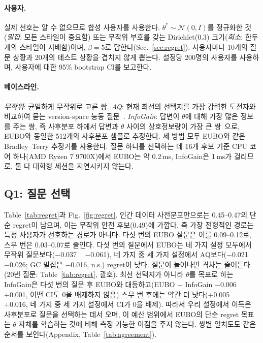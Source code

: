 \paragraph{사용자.} 실제 선호는 알 수 없으므로 합성 사용자를 사용한다. $\theta^\ast \sim \mathcal{N}(0,I)$를 정규화한 것
(\emph{밀집}: 모든 스타일이 중요함) 또는 무작위 부호를 갖는 Dirichlet(0.3) 크기(\emph{희소}: 한두 개의 스타일이 지배함)이며,
$\beta=5$로 답한다(Sec.~\ref{sec:regret}). 사용자마다 10개의 질문 상황과 20개의 테스트 상황을 겹치지 않게 뽑는다.
설정당 200명의 사용자를 사용하며, 사용자에 대한 95\% bootstrap CI를 보고한다.

\paragraph{베이스라인.} \emph{무작위}: 균일하게 무작위로 고른 쌍. \emph{AQ}: 현재 최선의 선택지를 가장 강력한 도전자와
비교하여 묻는 version-space 능동 질문~\citep{padurean2025useralign}. \emph{InfoGain}: 답변이 $\theta$에 대해 가장 많은 정보를 주는 쌍,
즉 사후분포 하에서 답변과 $\theta$ 사이의 상호정보량이 가장 큰 쌍~\citep{sadigh2017active}으로, EUBO와 동일한 512개의 사후분포 샘플로
추정한다. 세 방법 모두 EUBO와 같은 Bradley--Terry 추정기를 사용한다. 질문 하나를 선택하는 데 16개 후보 기준 CPU 코어 하나(AMD Ryzen 7 9700X)에서
EUBO는 약 0.2\,ms, InfoGain은 1\,ms가 걸리므로, 둘 다 대화형 세션을 지연시키지 않는다.

\subsection{Q1: 질문 선택}
Table~\ref{tab:regret}과 Fig.~\ref{fig:regret}. 인간 데이터 사전분포만으로는 0.45--0.47의 단순 regret이 남으며, 이는 무작위
안전 후보(0.49)에 가깝다. 즉 가장 전형적인 경로는 특정 사용자가 선호하는 경로가 아니다. 다섯 번의 EUBO 질문은 이를 0.09--0.12로, 스무 번은
0.03--0.07로 줄인다. 다섯 번의 질문에서 EUBO는 네 가지 설정 모두에서 무작위 질문보다($-$0.037 ~ $-$0.061), 네 가지 중 세 가지 설정에서
AQ보다($-$0.021 ~ $-$0.026; GC 밀집은 $-$0.016, n.s.) regret이 낮다. 질문이 늘어나면 격차는 줄어든다(20번 질문: Table~\ref{tab:regret}, 괄호).
최선 선택지가 아니라 $\theta$를 목표로 하는 InfoGain은 다섯 번의 질문 후 EUBO와 대등하고(EUBO $-$ InfoGain $-$0.006 ~
+0.001, 어떤 CI도 0을 배제하지 않음) 스무 번 후에는 약간 더 낫다(+0.005 ~ +0.016, 네 가지 중 세 가지 설정에서 CI가 0을 배제).
따라서 우리 설정에서 이득은 사후분포로 질문을 선택하는 데서 오며, 이 예산 범위에서 EUBO의 단순 regret 목표는 $\theta$ 자체를 학습하는 것에 비해
측정 가능한 이점을 주지 않는다.
쌍별 일치도도 같은 순서를 보인다(Appendix, Table~\ref{tab:agreement}).

